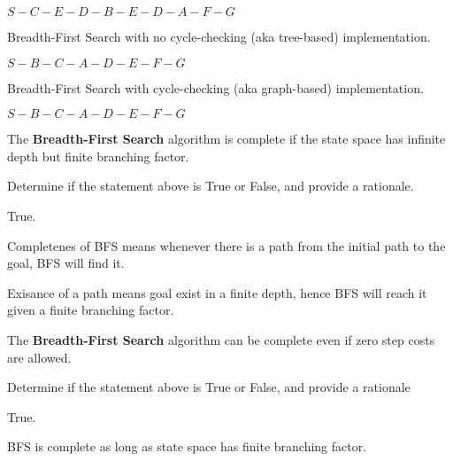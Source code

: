 \begin{listo}
\begin{listo}
        \begin{solution}
            $S - C - E - D - B - E - D - A - F - G$
        \end{solution}

        \item Breadth-First Search with no cycle-checking (aka tree-based) implementation.

        \begin{solution}
            $S - B - C - A - D - E - F - G$
        \end{solution}

        \item Breadth-First Search with cycle-checking (aka graph-based) implementation.

        \begin{solution}
            $S - B - C - A - D - E - F - G$
        \end{solution}
    \end{listo}

    \item \begin{listo}
        \item The \textbf{Breadth-First Search} algorithm is complete if the state space has infinite depth but finite branching factor.
        
        Determine if the statement above is True or False, and provide a rationale.

        \begin{solution}
            True. 

            Completenes of BFS means whenever there is a path from the initial path to the goal, BFS will find it. 

            Exisance of a path means goal exist in a finite depth, hence BFS will reach it given a finite branching factor.
        \end{solution}

        \item The \textbf{Breadth-First Search} algorithm can be complete even if zero step costs are allowed.

        Determine if the statement above is True or False, and provide a rationale

        \begin{solution}
            True. 

            BFS is complete as long as state space has finite branching factor. 
        \end{solution}


\end{listo}
\end{listo}
